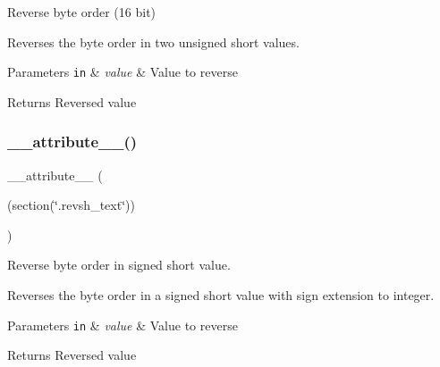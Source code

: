 Reverse byte order (16 bit) 

Reverses the byte order in two unsigned short values. 
\begin{DoxyParams}[1]{Parameters}
\mbox{\tt in}  & {\em value} & Value to reverse \\
\hline
\end{DoxyParams}
\begin{DoxyReturn}{Returns}
Reversed value 
\end{DoxyReturn}
\mbox{\label{group___c_m_s_i_s___core___instruction_interface_ga8e7a866927d3257a82b884ad14dbef4c}} 
\subsubsection{\texorpdfstring{\+\_\+\+\_\+attribute\+\_\+\+\_\+()}{\_\_attribute\_\_()}\hspace{0.1cm}{\footnotesize\ttfamily [2/3]}}
{\footnotesize\ttfamily \+\_\+\+\_\+attribute\+\_\+\+\_\+ (\begin{DoxyParamCaption}\item[{(section(\char`\"{}.revsh\+\_\+text\char`\"{}))}]{ }\end{DoxyParamCaption})}



Reverse byte order in signed short value. 

Reverses the byte order in a signed short value with sign extension to integer. 
\begin{DoxyParams}[1]{Parameters}
\mbox{\tt in}  & {\em value} & Value to reverse \\
\hline
\end{DoxyParams}
\begin{DoxyReturn}{Returns}
Reversed value 
\end{DoxyReturn}
\mbox{\label{group___c_m_s_i_s___core___instruction_interface_gab926fe7178a379c3a7c0410b06fcb661}} 
